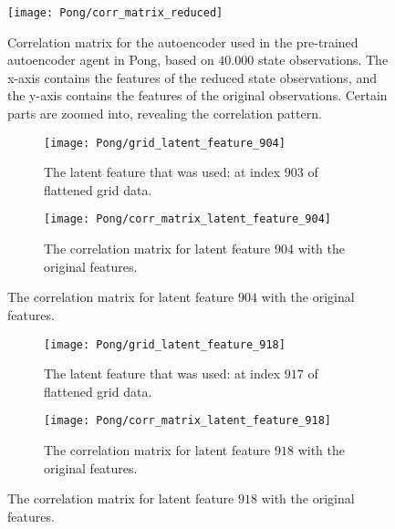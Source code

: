 \begin{figure}[h]
	\centering
	\texttt{[image: Pong/corr\_matrix\_reduced]}
	\caption{Correlation matrix for the autoencoder used in the pre-trained autoencoder agent in Pong, based on $40.000$ state observations. The x-axis contains the features of the reduced state observations, and the y-axis contains the features of the original observations. Certain parts are zoomed into, revealing the correlation pattern.}
	\label{fig:ae-corr-pong}
\end{figure}

\begin{figure}[h]
	\centering
	\begin{subfigure}[b]{0.2\textwidth}
		\texttt{[image: Pong/grid\_latent\_feature\_904]}
		\caption{The latent feature that was used: at index $903$ of flattened grid data.}
		\label{fig:ae-latent-feature-pong} 
	\end{subfigure}\hfill
	\begin{subfigure}[b]{0.75\textwidth}
		\texttt{[image: Pong/corr\_matrix\_latent\_feature\_904]}
		\caption{The correlation matrix for latent feature $904$ with the original features.}
		\label{fig:ae-latent-feature-corr-matrix-pong}
	\end{subfigure}
	\caption{The correlation matrix for latent feature $904$ with the original features.}
	\label{fig:latent-feature-corr-pong}
\end{figure}

\begin{figure}[h]
	\centering
	\begin{subfigure}[b]{0.2\textwidth}
		\texttt{[image: Pong/grid\_latent\_feature\_918]}
		\caption{The latent feature that was used: at index $917$ of flattened grid data.}
		\label{fig:ae-latent-feature-pong2} 
	\end{subfigure}\hfill
	\begin{subfigure}[b]{0.75\textwidth}
		\texttt{[image: Pong/corr\_matrix\_latent\_feature\_918]}
		\caption{The correlation matrix for latent feature $918$ with the original features.}
		\label{fig:ae-latent-feature-corr-matrix-pong2}
	\end{subfigure}
	\caption{The correlation matrix for latent feature $918$ with the original features.}
	\label{fig:latent-feature-corr-pong2}
\end{figure}

